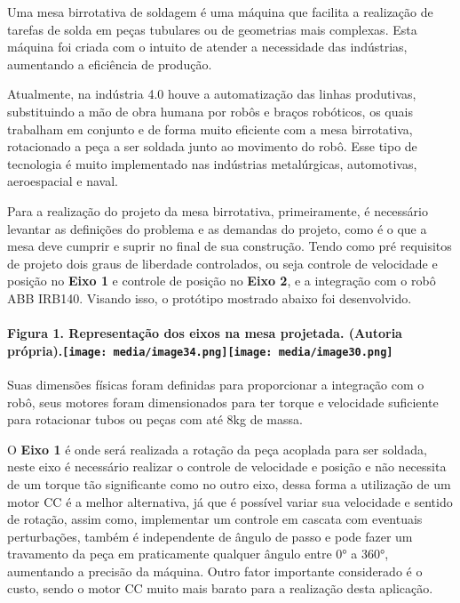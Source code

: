 \documentclass[]{article}
\let\oldparagraph\paragraph
\renewcommand{\paragraph}[1]{\oldparagraph{#1}\mbox{}}
\begin{document}
Uma mesa birrotativa de soldagem é uma máquina que facilita a realização
de tarefas de solda em peças tubulares ou de geometrias mais complexas.
Esta máquina foi criada com o intuito de atender a necessidade das
indústrias, aumentando a eficiência de produção.

Atualmente, na indústria 4.0 houve a automatização das linhas
produtivas, substituindo a mão de obra humana por robôs e braços
robóticos, os quais trabalham em conjunto e de forma muito eficiente com
a mesa birrotativa, rotacionado a peça a ser soldada junto ao movimento
do robô. Esse tipo de tecnologia é muito implementado nas indústrias
metalúrgicas, automotivas, aeroespacial e naval.

Para a realização do projeto da mesa birrotativa, primeiramente, é
necessário levantar as definições do problema e as demandas do projeto,
como é o que a mesa deve cumprir e suprir no final de sua construção.
Tendo como pré requisitos de projeto dois graus de liberdade
controlados, ou seja controle de velocidade e posição no \textbf{Eixo 1}
e controle de posição no \textbf{Eixo 2}, e a integração com o robô ABB
IRB140. Visando isso, o protótipo mostrado abaixo foi desenvolvido.

\paragraph{\texorpdfstring{Figura 1. Representação dos eixos na mesa
projetada. (Autoria
própria).\protect\texttt{[image: media/image34.png]}\protect\texttt{[image: media/image30.png]}}{Figura 1. Representação dos eixos na mesa projetada. (Autoria própria).}}\label{figura-1.-representauxe7uxe3o-dos-eixos-na-mesa-projetada.-autoria-pruxf3pria.}

Suas dimensões físicas foram definidas para proporcionar a integração
com o robô, seus motores foram dimensionados para ter torque e
velocidade suficiente para rotacionar tubos ou peças com até 8kg de
massa.

O \textbf{Eixo 1} é onde será realizada a rotação da peça acoplada para
ser soldada, neste eixo é necessário realizar o controle de velocidade e
posição e não necessita de um torque tão significante como no outro
eixo, dessa forma a utilização de um motor CC é a melhor alternativa, já
que é possível variar sua velocidade e sentido de rotação, assim como,
implementar um controle em cascata com eventuais perturbações, também é
independente de ângulo de passo e pode fazer um travamento da peça em
praticamente qualquer ângulo entre 0° a 360°, aumentando a precisão da
máquina. Outro fator importante considerado é o custo, sendo o motor CC
muito mais barato para a realização desta aplicação.
\end{document}
